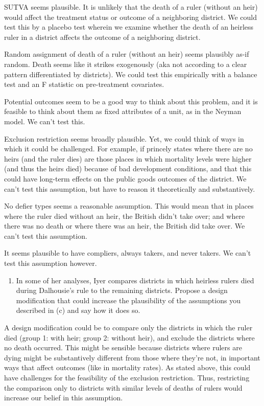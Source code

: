 \documentclass[
]{article}
\providecommand{\tightlist}{%
  \setlength{\itemsep}{0pt}\setlength{\parskip}{0pt}}
\begin{document}
SUTVA seems plausible. It is unlikely that the death of a ruler (without
an heir) would affect the treatment status or outcome of a neighboring
district. We could test this by a placebo test wherein we examine
whether the death of an heirless ruler in a district affects the outcome
of a neighboring district.

Random assignment of death of a ruler (without an heir) seems plausibly
as-if random. Death seems like it strikes exogenously (aka not according
to a clear pattern differentiated by districts). We could test this
empirically with a balance test and an F statistic on pre-treatment
covariates.

Potential outcomes seem to be a good way to think about this problem,
and it is feasible to think about them as fixed attributes of a unit, as
in the Neyman model. We can't test this.

Exclusion restriction seems broadly plausible. Yet, we could think of
ways in which it could be challenged. For example, if princely states
where there are no heirs (and the ruler dies) are those places in which
mortality levels were higher (and thus the heirs died) because of bad
development conditions, and that this could have long-term effects on
the public goods outcomes of the district. We can't test this
assumption, but have to reason it theoretically and substantively.

No defier types seems a reasonable assumption. This would mean that in
places where the ruler died without an heir, the British didn't take
over; and where there was no death or where there was an heir, the
British did take over. We can't test this assumption.

It seems plausible to have compliers, always takers, and never takers.
We can't test this assumption however.

\begin{enumerate}
\def\labelenumi{(\alph{enumi})}
\setcounter{enumi}{3}
\tightlist
\item
  In some of her analyses, Iyer compares districts in which heirless
  rulers died during Dalhousie's rule to the remaining districts.
  Propose a design modification that could increase the plausibility of
  the assumptions you described in (c) and say how it does so.
\end{enumerate}

A design modification could be to compare only the districts in which
the ruler died (group 1: with heir; group 2: without heir), and exclude
the districts where no death occurred. This might be sensible because
districts where rulers are dying might be substantively different from
those where they're not, in important ways that affect outcomes (like in
mortality rates). As stated above, this could have challenges for the
feasibility of the exclusion restriction. Thus, restricting the
comparison only to districts with similar levels of deaths of rulers
would increase our belief in this assumption.
\end{document}
